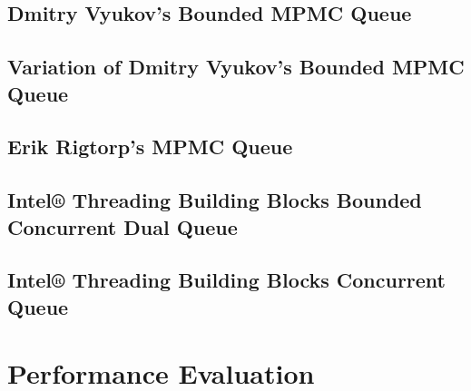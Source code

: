 \subsection[Dmitry Vyukov's MPMC Queue]{Dmitry Vyukov's Bounded MPMC Queue}

\subsection[Variation of Dmitry Vyukov's MPMC Queue]{Variation of Dmitry Vyukov's Bounded MPMC Queue}

\subsection[Erik Rigtorp's MPMC Queue]{Erik Rigtorp's MPMC Queue}

\subsection[Intel® TBB Bounded Concurrent Queue]{Intel® Threading Building Blocks Bounded Concurrent Dual Queue}%

\subsection[Intel® TBB Concurrent Queue]{Intel® Threading Building Blocks Concurrent Queue}%

\section[Performance Evaluation]{Performance Evaluation}